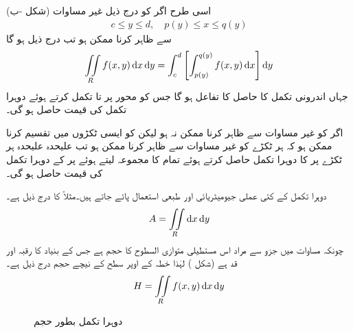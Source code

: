 اسی طرح اگر  کو درج ذیل غیر مساوات (شکل -ب)
\begin{align*}
c\le y\le d,\quad p(y)\le x \le q(y)
\end{align*}
 سے ظاہر کرنا ممکن ہو تب درج ذیل ہو گا
\begin{align}\label{مساوات_خطی_تکمل_دوہرا_ب}
\iint\limits_R f(x,y)\dif x \dif y=\int_c^d\left[\int_{p(y)}^{q(y)} f(x,y)\dif x\right]\dif y
\end{align}
جہاں اندرونی تکمل کا حاصل  کا تفاعل ہو گا جس کو  محور پر  تا  تکمل  کرتے ہوئے دوہرا تکمل کی قیمت حاصل ہو  گی۔

اگر  کو  غیر مساوات سے ظاہر کرنا ممکن نہ ہو لیکن  کو ایسی ٹکڑوں میں تقسیم کرنا ممکن ہو کہ ہر ٹکڑے کو غیر مساوات سے ظاہر کرنا ممکن ہو تب علیحدہ علیحدہ  ہر ٹکڑے  پر  کا دوہرا تکمل حاصل کرتے ہوئے تمام کا مجموعہ لیتے ہوئے  پر  کے دوہرا  تکمل کی قیمت حاصل ہو گی۔

دوہرا تکمل کے کئی عملی جیومیٹریائی اور طبعی استعمال پائے جاتے ہیں۔مثلاً  کا   درج ذیل ہے۔
\begin{align*}
A=\iint\limits_R \dif x\dif y
\end{align*}
چونکہ مساوات  میں جزو  سے مراد اس مستطیلی متوازی السطوح کا حجم ہے جس کے بنیاد کا رقبہ   اور قد  ہے  (شکل ) لہٰذا خطہ  کے اوپر سطح  کے نیچے  حجم   درج ذیل ہے۔
\begin{align*}
H=\iint\limits_R f(x,y)\dif x\dif y
\end{align*}
%
\begin{figure}
\centering
{}
\caption{دوہرا تکمل بطور حجم}
\label{شکل_خطی_تکمل_دوہرا_حجم}
\end{figure}

